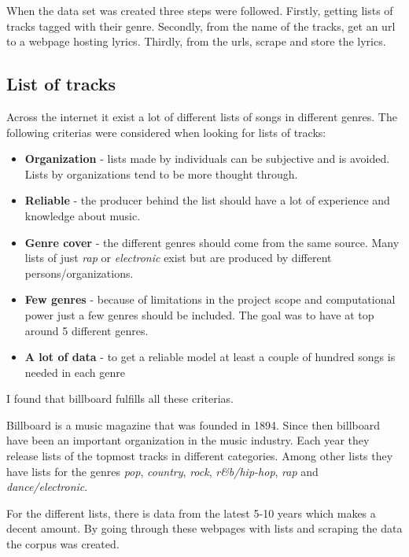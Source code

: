 \documentclass[a4paper, 12pt]{article}
\begin{document}
When the data set was created three steps were followed.
Firstly, getting lists of tracks tagged with their genre.
Secondly, from the name of the tracks, get an url to a webpage hosting lyrics.
Thirdly, from the urls, scrape and store the lyrics.

\subsection{List of tracks}
Across the internet it exist a lot of different lists of songs in different genres.
The following criterias were considered when looking for lists of tracks:
\begin{itemize}
    \item {\textbf{Organization} - lists made by individuals can be subjective and is avoided. Lists by organizations tend to be more thought through.}
    \item {\textbf{Reliable} - the producer behind the list should have a lot of experience and knowledge about music.}
    \item {\textbf{Genre cover} - the different genres should come from the same source. Many lists of just \textit{rap} or \textit{electronic} exist but are produced by different persons/organizations.}
    \item {\textbf{Few genres} - because of limitations in the project scope and computational power just a few genres should be included. The goal was to have at top around 5 different genres.}
    \item {\textbf{A lot of data} - to get a reliable model at least a couple of hundred songs is needed in each genre}
\end{itemize}

I found that billboard fulfills all these criterias.

Billboard is a music magazine that was founded in 1894.
Since then billboard have been an important organization in the music industry.
Each year they release lists of the topmost tracks in different categories.
Among other lists they have lists for the genres \textit{pop}, \textit{country}, \textit{rock}, \textit{r\&b/hip-hop}, \textit{rap} and \textit{dance/electronic}. \cite{billboard}

For the different lists, there is data from the latest 5-10 years which makes a decent amount.
By going through these webpages with lists and scraping the data the corpus was created.

\end{document}
